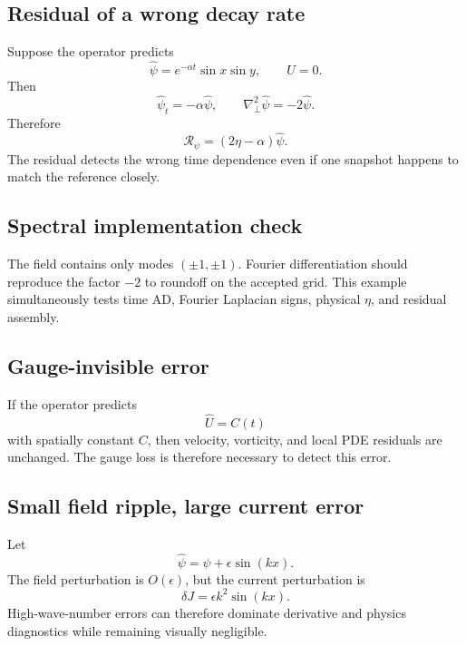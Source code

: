 \documentclass[11pt]{article}
\newcommand{\Lap}{\nabla_\perp^2}
\newcommand{\Rpsi}{\mathcal{R}_{\psi}}
\begin{document}
\subsection{Residual of a wrong decay rate}
Suppose the operator predicts
\begin{equation}
\widehat\psi=e^{-\alpha t}\sin x\sin y,
\qquad \widehat U=0.
\end{equation}
Then
\begin{equation}
\widehat\psi_t=-\alpha\widehat\psi,
\qquad
\Lap\widehat\psi=-2\widehat\psi.
\end{equation}
Therefore
\begin{equation}
\boxed{
\Rpsi=(2\eta-\alpha)\widehat\psi.
}
\label{eq:wrong_decay}
\end{equation}
The residual detects the wrong time dependence even if one snapshot happens to match the reference closely.

\subsection{Spectral implementation check}
The field contains only modes $(\pm1,\pm1)$. Fourier differentiation should reproduce the factor $-2$ to roundoff on the accepted grid. This example simultaneously tests time AD, Fourier Laplacian signs, physical $\eta$, and residual assembly.

\subsection{Gauge-invisible error}
If the operator predicts
\begin{equation}
\widehat U=C(t)
\end{equation}
with spatially constant $C$, then velocity, vorticity, and local PDE residuals are unchanged. The gauge loss is therefore necessary to detect this error.

\subsection{Small field ripple, large current error}
Let
\begin{equation}
\widehat\psi=\psi+\epsilon\sin(kx).
\end{equation}
The field perturbation is $O(\epsilon)$, but the current perturbation is
\begin{equation}
\delta J=\epsilon k^2\sin(kx).
\end{equation}
High-wave-number errors can therefore dominate derivative and physics diagnostics while remaining visually negligible.
\end{document}
